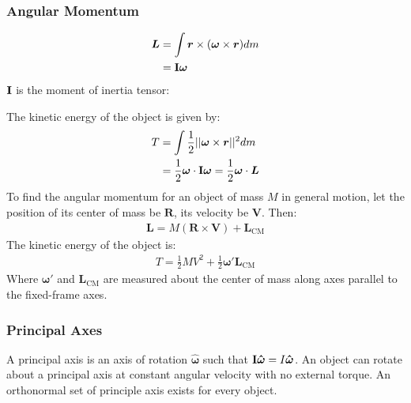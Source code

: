 \documentclass[11pt]{article}
\newcommand{\ve}[1]{
  \ensuremath{\bm{#1}}}	               %
\newcommand{\uve}[1]{
  \ensuremath{\bm{\hat{#1}}}}          %
\newcommand{\tensor}[1]{
  \ensuremath{\text{\bf{#1}}}}         %
\begin{document}
\begin{multicols*}{3}
\subsubsection{Angular Momentum}
\begin{align*}
  \ve{L} &= \int \ve{r} \times (\ve{\omega} \times \ve{r}) dm \\
  &= \tensor{I} \ve{\omega}
\end{align*}
$\tensor{I}$ is the moment of inertia tensor:
\vspace*{-0.7em}
\begin{center}
\end{center}
The kinetic energy of the object is given by:
\begin{align*}
  T &= \int\frac{1}{2} ||\ve{\omega} \times \ve{r}||^2 dm \\
  &= \frac{1}{2} \ve{\omega} \cdot \tensor{I}\ve{\omega} = \frac{1}{2} \ve{\omega} \cdot \ve{L}
\end{align*}
To find the angular momentum for an object of mass $M$ in general motion, let the position of its center of mass be $\ve{R}$, its velocity be $\ve{V}$. Then:
\begin{align*}
  \ve{L} = M(\ve{R} \times \ve{V}) + \ve{L}_{\text{CM}}
\end{align*}
The kinetic energy of the object is:
\begin{align*}
  T = \frac{1}{2}MV^2 + \frac{1}{2}\ve{\omega}' \ve{L}_{\text{CM}}
\end{align*}
Where $\ve{\omega}'$ and $\ve{L}_{\text{CM}}$ are measured about the center of mass along axes parallel to the fixed-frame axes.

\subsubsection{Principal Axes}
A principal axis is an axis of rotation $\uve{\omega}$ such that $\tensor{I}\uve{\omega} = I\uve{\omega}$. An object can rotate about a principal axis at constant angular velocity with no external torque. An orthonormal set of principle axis exists for every object.


\end{multicols*}
\end{document}
